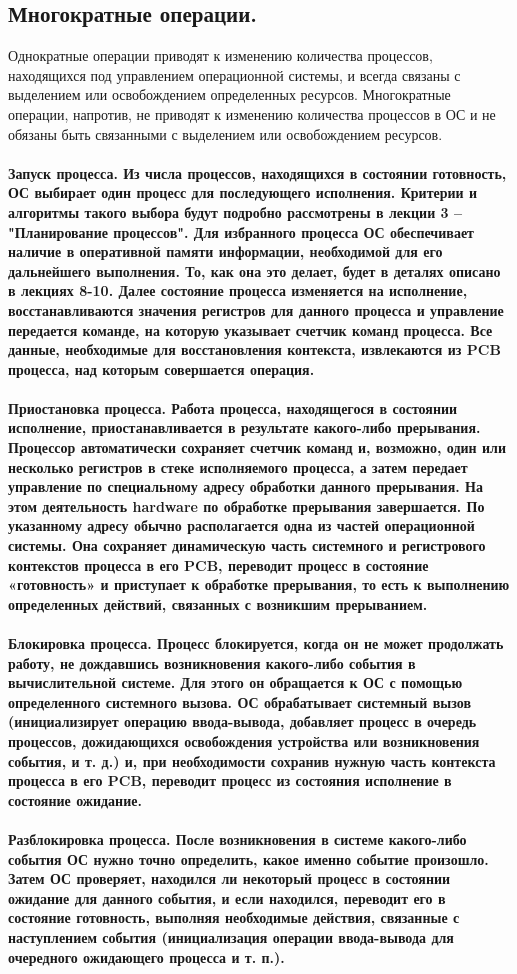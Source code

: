 \documentclass[a4paper]{article}
\begin{document}
\subsection{\Large Многократные операции.}
Однократные операции приводят к изменению количества процессов, находящихся под управлением операционной системы, и всегда связаны с выделением или освобождением определенных ресурсов. Многократные операции, напротив, не приводят к изменению количества процессов в ОС и не обязаны быть связанными с выделением или освобождением ресурсов.\\\\
\bf Запуск процесса. \rm Из числа процессов, находящихся в состоянии готовность, ОС выбирает один процесс для последующего исполнения. Критерии и алгоритмы такого выбора будут подробно рассмотрены в лекции 3 – "Планирование процессов". Для избранного процесса ОС обеспечивает наличие в оперативной памяти информации, необходимой для его дальнейшего выполнения. То, как она это делает, будет в деталях описано в лекциях 8-10. Далее состояние процесса изменяется на исполнение, восстанавливаются значения регистров для данного процесса и управление передается команде, на которую указывает счетчик команд процесса. Все данные, необходимые для восстановления контекста, извлекаются из PCB процесса, над которым совершается операция.\\\\
\bf Приостановка процесса. \rm Работа процесса, находящегося в состоянии исполнение, приостанавливается в результате
какого-либо прерывания. Процессор автоматически сохраняет счетчик команд и, возможно, один или несколько регистров в стеке исполняемого процесса, а затем передает управление по специальному адресу обработки данного прерывания. На этом деятельность hardware по обработке прерывания завершается. По указанному адресу обычно располагается одна из частей операционной системы. Она сохраняет динамическую часть системного и регистрового контекстов процесса в его PCB, переводит процесс в состояние «готовность» и приступает к обработке прерывания, то есть к выполнению определенных действий, связанных с возникшим прерыванием.\\\\
\bf Блокировка процесса. \rm Процесс блокируется, когда он не может продолжать работу, не дождавшись возникновения какого-либо события в вычислительной системе. Для этого он обращается к ОС с помощью определенного системного вызова. ОС обрабатывает системный вызов (инициализирует операцию ввода-вывода, добавляет процесс в очередь процессов, дожидающихся освобождения устройства или возникновения события, и т. д.) и, при необходимости сохранив нужную часть контекста процесса в его PCB, переводит процесс из состояния исполнение в состояние ожидание.\\\\
\bf Разблокировка процесса. \rm После возникновения в системе какого-либо события ОС нужно точно определить, какое именно событие произошло. Затем ОС проверяет, находился ли некоторый процесс в состоянии ожидание для данного события, и если находился, переводит его в состояние готовность, выполняя необходимые действия, связанные с наступлением события (инициализация операции ввода-вывода для очередного ожидающего процесса и т. п.).
\end{document}
